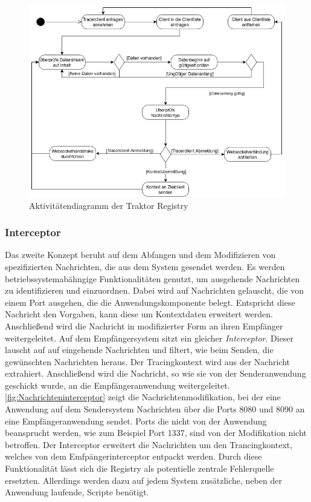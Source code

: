 \begin{figure}[!ht]
	\centering
	\includegraphics[scale=0.65]{img/Design/Traktor-Registry.png}
	\caption[Aktivitätendiagramm der Traktor Registry]{Aktivitätendiagramm der Traktor Registry}
	\label{fig:Traktor-Registry}
\end{figure}

\subsubsection{Interceptor}
Das zweite Konzept beruht auf dem Abfangen und dem Modifizieren von spezifizierten Nachrichten, die aus dem System gesendet werden. Es werden betriebssystemabähngige Funktionalitäten genutzt, um ausgehende Nachrichten zu identifizieren und einzuordnen. Dabei wird auf Nachrichten gelauscht, die von einem Port ausgehen, die die Anwendungskomponente belegt. Entspricht diese Nachricht den Vorgaben, kann diese um Kontextdaten erweitert werden. Anschließend wird die Nachricht in modifizierter Form an ihren Empfänger weitergeleitet. Auf dem Empfängersystem sitzt ein gleicher \emph{Interceptor}. Dieser lauscht auf auf eingehende Nachrichten und filtert, wie beim Senden, die gewünschten Nachrichten heraus. Der Tracingkontext wird aus der Nachricht extrahiert. Anschließend wird die Nachricht, so wie sie von der Senderanwendung geschickt wurde, an die Empfängeranwendung weitergeleitet. \cref{fig:Nachrichteninterceptor} zeigt die Nachrichtenmodifikation, bei der eine Anwendung auf dem Sendersystem Nachrichten über die Ports 8080 und 8090 an eine Empfängeranwendung sendet. Ports die nicht von der Anwendung beansprucht werden, wie zum Beispiel Port 1337, sind von der Modifikation nicht betroffen. Der Interceptor erweitert die Nachrichten um den Trancingkontext, welches von dem Emfpängerinterceptor entpackt werden. Durch diese Funktionalität lässt sich die Registry als potentielle zentrale Fehlerquelle ersetzten. Allerdings werden dazu auf jedem System zusätzliche, neben der Anwendung laufende, Scripte benötigt.

